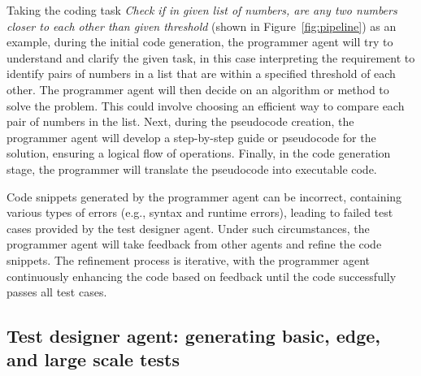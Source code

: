 \documentclass[manuscript,screen,review]{acmart}
\begin{document}
Taking the coding task \textit{Check if in given list of numbers, are any two numbers closer to each other than given threshold} (shown in Figure~\ref{fig:pipeline}) as an example, during the initial code generation, the programmer agent will try to understand and clarify the given task, in this case interpreting the requirement to identify pairs of numbers in a list that are within a specified threshold of each other. The programmer agent will then decide on an algorithm or method to solve the problem. This could involve choosing an efficient way to compare each pair of numbers in the list. Next, during the pseudocode creation, the programmer agent will develop a step-by-step guide or pseudocode for the solution, ensuring a logical flow of operations. Finally, in the code generation stage, the programmer will translate the pseudocode into executable code.

Code snippets generated by the programmer agent can be incorrect, containing various types of errors (e.g., syntax and runtime errors), leading to failed test cases provided by the test designer agent.
Under such circumstances, the programmer agent will take feedback from other agents and refine the code snippets. The refinement process is iterative, with the programmer agent continuously enhancing the code based on feedback until the code successfully passes all test cases.


\subsection{Test designer agent: generating basic, edge, and large scale tests}
\end{document}

